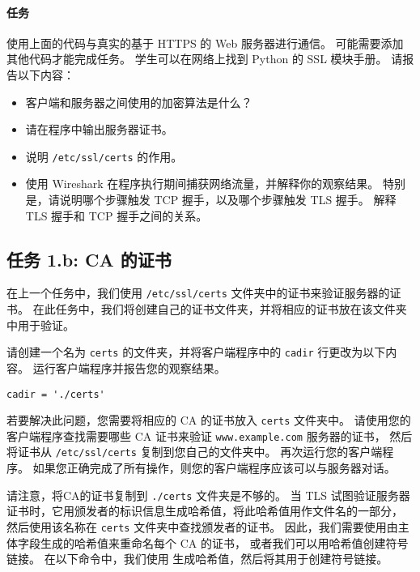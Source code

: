 \paragraph{任务} 使用上面的代码与真实的基于 HTTPS 的 Web 服务器进行通信。
可能需要添加其他代码才能完成任务。
学生可以在网络上找到 Python 的 SSL 模块手册。
请报告以下内容：
\begin{itemize}
    \item 客户端和服务器之间使用的加密算法是什么？
    \item 请在程序中输出服务器证书。
    \item 说明 \texttt{/etc/ssl/certs} 的作用。
    \item 使用 Wireshark 在程序执行期间捕获网络流量，并解释你的观察结果。
          特别是，请说明哪个步骤触发 TCP 握手，以及哪个步骤触发 TLS 握手。
          解释 TLS 握手和 TCP 握手之间的关系。
\end{itemize}



\subsection{任务 1.b: CA 的证书}

在上一个任务中，我们使用 \texttt{/etc/ssl/certs} 文件夹中的证书来验证服务器的证书。
在此任务中，我们将创建自己的证书文件夹，并将相应的证书放在该文件夹中用于验证。

请创建一个名为 \texttt{certs} 的文件夹，并将客户端程序中的 \texttt{cadir} 行更改为以下内容。
运行客户端程序并报告您的观察结果。

\begin{lstlisting}
cadir = './certs'
\end{lstlisting}


若要解决此问题，您需要将相应的 CA 的证书放入 \texttt{certs} 文件夹中。
请使用您的客户端程序查找需要哪些 CA 证书来验证 \texttt{www.example.com} 服务器的证书，
然后将证书从 \texttt{/etc/ssl/certs} 复制到您自己的文件夹中。
再次运行您的客户端程序。
如果您正确完成了所有操作，则您的客户端程序应该可以与服务器对话。


请注意，将CA的证书复制到 \texttt{./certs} 文件夹是不够的。
当 TLS 试图验证服务器证书时，它用颁发者的标识信息生成哈希值，将此哈希值用作文件名的一部分，
然后使用该名称在 \texttt{certs} 文件夹中查找颁发者的证书。
因此，我们需要使用由主体字段生成的哈希值来重命名每个 CA 的证书，
或者我们可以用哈希值创建符号链接。
在以下命令中，我们使用 \openssl 生成哈希值，然后将其用于创建符号链接。

